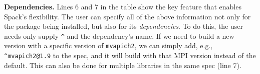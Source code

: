 {\bf Dependencies.}
Lines 6 and 7 in the table show the key feature that enables Spack's flexibility.
The user can specify all of the above information not only for the package being
installed, but also for its {\it dependencies}.  To do this, the user needs only supply 
\verb|^| and the dependency's name.  If we need to build a new version with a specific
version of {\tt mvapich2}, we can simply add, e.g., \verb|^mvapich2@1.9|
to the spec, and it will build with that MPI version instead of the default.
This can also be done for multiple libraries in the same spec (line 7).  







